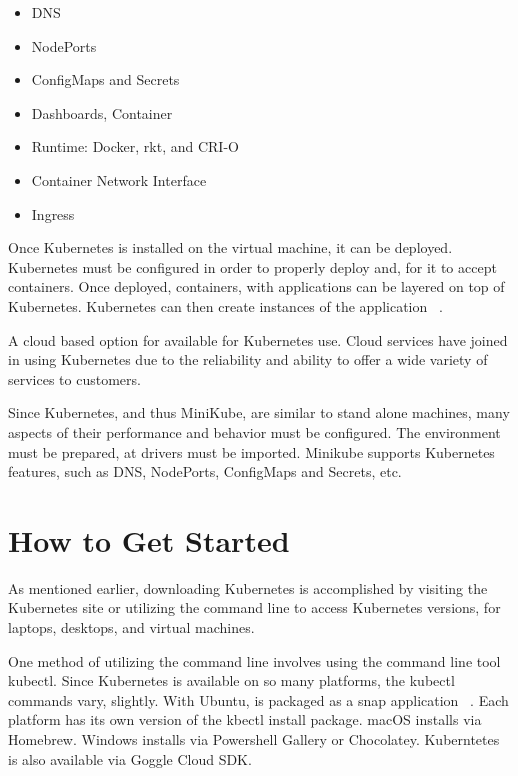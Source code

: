 \begin{itemize}
    \item DNS 
    
    \item NodePorts 
    
    \item ConfigMaps and Secrets 
    
    \item Dashboards, Container 
    
    \item Runtime:  Docker, rkt, and CRI-O 
    
    \item Container Network Interface
    
    \item Ingress  
 \end{itemize}   
 
Once Kubernetes is installed on the virtual machine, it can be
deployed.  Kubernetes must be configured in order to properly deploy
and, for it to accept containers.  Once deployed, containers, with
applications can be layered on top of Kubernetes.  Kubernetes can then
create instances of the application ~\cite{concept}.

A cloud based option for available for Kubernetes use.  Cloud services 
have joined in using Kubernetes due to the reliability and ability to
offer a wide variety of services to customers.   

Since Kubernetes, and thus MiniKube, are similar to stand alone
machines, many aspects of their performance and behavior must be
configured.  The environment must be prepared, at drivers must be 
imported.  Minikube supports Kubernetes
features, such as DNS, NodePorts, ConfigMaps and Secrets, etc.   

\section{How to Get Started}

As mentioned earlier, downloading Kubernetes is accomplished by
visiting the Kubernetes site or utilizing the command line to access
Kubernetes versions, for laptops, desktops, and virtual machines.  

One method of utilizing the command line involves using the command
line tool kubectl.  Since Kubernetes is available on so many
platforms, the kubectl commands vary, slightly.  With Ubuntu, is
packaged as a snap application ~\cite{kubectl}.  Each platform has
its own version of the kbectl install package.  macOS installs via
Homebrew.  Windows installs via Powershell Gallery or Chocolatey.
Kuberntetes is also available via Goggle Cloud SDK\cite{kubectl}.\

